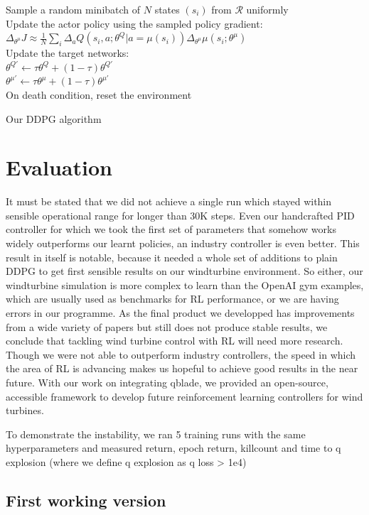 \documentclass[hyperref,german,beleg]{cgvpub}
\begin{document}
\begin{algorithm}
{{    Sample a random minibatch of $N$ states $(s_i)$ from $\mathcal{R}$ uniformly\\
    Update the actor policy using the sampled policy gradient: $\Delta_{\theta^{\mu}} J \approx \frac{1}{N} \sum_{i} \Delta_a Q(s_i, a;\theta^Q | a=\mu(s_i)) \Delta_{\theta^{\mu}}\mu(s_i;\theta^{\mu})$\\
    Update the target networks:\\
    $\theta^{Q'} \leftarrow \tau \theta^{Q} + (1-\tau)\theta^{Q'}$\\
    $\theta^{\mu'} \leftarrow \tau \theta^{\mu} + (1-\tau)\theta^{\mu'}$\\
    On death condition, reset the environment
  }
}
\caption{Our DDPG algorithm}
\label{alg:ourddpg}
\end{algorithm}

\chapter{Evaluation}

It must be stated that we did not achieve a single run which stayed within sensible operational range for longer than 30K steps. Even our handcrafted PID controller for which we took the first set of parameters that somehow works widely outperforms our learnt policies, an industry controller is even better. This result in itself is notable, because it needed a whole set of additions to plain \ac{DDPG} to get first sensible results on our windturbine environment. So either, our windturbine simulation is more complex to learn than the OpenAI gym examples, which are usually used as benchmarks for \ac{RL} performance, or we are having errors in our programme. As the final product we developped has improvements from a wide variety of papers but still does not produce stable results, we conclude that tackling wind turbine control with \ac{RL} will need more research. Though we were not able to outperform industry controllers, the speed in which the area of \ac{RL} is advancing makes us hopeful to achieve good results in the near future. With our work on integrating qblade, we provided an open-source, accessible framework to develop future reinforcement learning controllers for wind turbines.

To demonstrate the instability, we ran 5 training runs with the same hyperparameters and measured return, epoch return, killcount and time to q explosion (where we define q explosion as q loss > 1e4)

\section{First working version}
\end{document}
